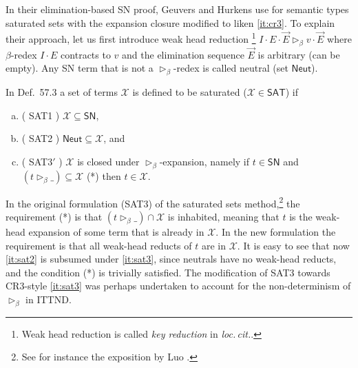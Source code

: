 \documentclass[a4paper,USenglish,cleveref, autoref, thm-restate]{lipics-v2019}
\makeatletter
\def\namedlabel#1#2{\begingroup
    #2%
    \def\@currentlabel{#2}%
    \phantomsection\label{#1}\endgroup
}
\newcommand{\loccit}{\emph{loc.\,cit.}\xspace}
\newcommand{\whd}[1][]{\rhd_{#1}}
\newcommand{\X}{\mathcal{X}}
\newcommand{\SN}{\mathsf{SN}}
\newcommand{\Neut}{\mathsf{Neut}}
\newcommand{\SAT}{\mathsf{SAT}}
\makeatother
\begin{document}
In their elimination-based SN proof, Geuvers and Hurkens
\cite[Section~6.1]{geuversHurkens:types17} use for semantic types
saturated sets with the expansion closure modified to liken
\ref{it:cr3}.  To explain their approach, let us first introduce weak
head reduction%
\footnote{Weak head reduction is called \emph{key reduction} in \loccit.}
$I \cdot E \cdot \vec E \whd[\beta] v \cdot \vec E$ where
$\beta$-redex $I \cdot E$ contracts to $v$ and the elimination
sequence $\vec E$ is arbitrary (can be empty).  Any SN term that is
not a $\whd[\beta]$-redex is called neutral (set $\Neut$).

In Def.~57.3 \cite{geuversHurkens:types17}
a set of terms $\X$ is defined to be saturated ($\X \in
\SAT$) if
\begin{enumerate}[a.]

\item (\namedlabel{it:sat1}{SAT1}) $\X \subseteq \SN$,

\item (\namedlabel{it:sat2}{SAT2}) $\Neut \subseteq \X$, and

\item (\namedlabel{it:sat3}{SAT3$'$}) $\X$ is closed under
  $\whd[\beta]$-expansion, namely if $t \in \SN$ and
  $(t \whd[\beta]\_) \subseteq \X$ (*) then $t \in \X$.

\end{enumerate}
In the original formulation (SAT3) of the saturated sets
method,\footnote{See for instance the exposition by Luo \cite{luo:thesis}.}
the requirement (*) is that $(t \whd[\beta]\_) \cap \X$ is inhabited,
meaning that $t$ is the weak-head expansion of some term that is already
in $\X$.  In the new formulation the requirement is that all
weak-head reducts of $t$ are in $\X$.  It is easy to see that now
\ref{it:sat2} is subsumed under \ref{it:sat3}, since neutrals have
no weak-head reducts, and the condition (*) is trivially satisfied.
The modification of SAT3 towards CR3-style \ref{it:sat3} was perhaps
undertaken to account for the non-determinism of $\whd[\beta]$ in
ITTND.
\end{document}
